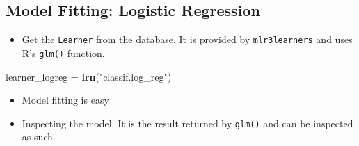 \documentclass[]{article}
\newenvironment{Shaded}{\begin{snugshade}}{\end{snugshade}}
\newcommand{\KeywordTok}[1]{\textcolor[rgb]{0.13,0.29,0.53}{\textbf{#1}}}
\newcommand{\NormalTok}[1]{#1}
\newcommand{\OperatorTok}[1]{\textcolor[rgb]{0.81,0.36,0.00}{\textbf{#1}}}
\newcommand{\StringTok}[1]{\textcolor[rgb]{0.31,0.60,0.02}{#1}}
\providecommand{\tightlist}{%
  \setlength{\itemsep}{0pt}\setlength{\parskip}{0pt}}
\begin{document}
\hypertarget{model-fitting-logistic-regression}{%
\subsection{Model Fitting: Logistic
Regression}\label{model-fitting-logistic-regression}}

\begin{itemize}
\tightlist
\item
  Get the \texttt{Learner} from the database. It is provided by
  \texttt{mlr3learners} and uses R's \texttt{glm()} function.
\end{itemize}

\begin{Shaded}
\begin{Highlighting}[]
\NormalTok{learner_logreg =}\StringTok{ }\KeywordTok{lrn}\NormalTok{(}\StringTok{"classif.log_reg"}\NormalTok{)}
\end{Highlighting}
\end{Shaded}

\begin{itemize}
\tightlist
\item
  Model fitting is easy
\end{itemize}

\begin{Shaded}
\end{Shaded}

\begin{itemize}
\tightlist
\item
  Inspecting the model. It is the result returned by \texttt{glm()} and
  can be inspected as such.
\end{itemize}
\end{document}
